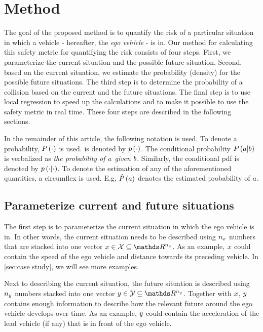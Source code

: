 \section{Method}
\label{sec:method}

The goal of the proposed method is to quantify the risk of a particular situation in which a vehicle - hereafter, the \textit{ego vehicle} - is in.
Our method for calculating this safety metric for quantifying the risk consists of four steps. 
First, we parameterize the current situation and the possible future situation.
Second, based on the current situation, we estimate the probability (density) for the possible future situations. 
The third step is to determine the probability of a collision based on the current and the future situations.
The final step is to use local regression to speed up the calculations and to make it possible to use the safety metric in real time. 
These four steps are described in the following sections.

In the remainder of this article, the following notation is used. 
To denote a probability, $P\left( \cdot \right)$ is used. 
 is denoted by $p\left( \cdot \right)$. 
The conditional probability $P\left(  a | b  \right)$ is verbalized as \textit{the probability of $a$ given $b$}. 
Similarly, the conditional \ac{pdf} is denoted by $p\left(  \cdot | \cdot  \right)$. 
To denote the estimation of any of the aforementioned quantities, a circumflex is used. 
E.g, $\hat{P}\left( a \right)$ denotes the estimated probability of $a$.



\subsection{Parameterize current and future situations}
\label{sec:parametrization}

The first step is to parameterize the current situation in which the ego vehicle is in. 
In other words, the current situation needs to be described using $n_{x}$ numbers that are stacked into one vector $\situationcurrent \in \situationcurrentspace \subseteq \realnumbers^{\situationcurrentdim}$. 
As an example, $x$ could contain the speed of the ego vehicle and distance towards its preceding vehicle. 
In \cref{sec:case study}, we will see more examples.

Next to describing the current situation, the future situation is described using $n_{y}$ numbers stacked into one vector $\situationfuture \in \situationfuturespace \subseteq \realnumbers^{\situationfuturedim}$. 
Together with $x$, $y$ contains enough information to describe how the relevant future around the ego vehicle develops over time. 
As an example, $y$ could contain the acceleration of the lead vehicle (if any) that is in front of the ego vehicle.

